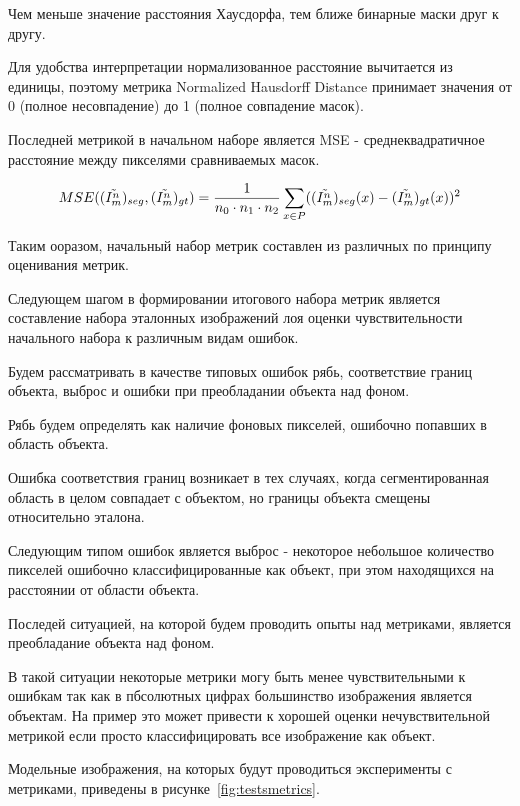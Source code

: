Чем меньше значение расстояния Хаусдорфа, тем ближе бинарные маски друг к другу.

Для удобства интерпретации нормализованное расстояние вычитается из единицы, поэтому метрика Normalized Hausdorff Distance принимает значения от 0 (полное несовпадение) до 1 (полное совпадение масок).

Последней метрикой в начальном наборе является MSE - среднеквадратичное расстояние между пикселями сравниваемых масок.

\begin{equation}\label{eq:MSE}
    MSE((\tilde{I^n_m})_{seg}, (\tilde{I^n_m})_{gt}) = \frac{1}{n_0 \cdot n_1 \cdot n_2} \sum_{x \in P} ((\tilde{I^n_m})_{seg}(x) - (\tilde{I^n_m})_{gt}(x))^2
\end{equation}

Таким ооразом, начальный набор метрик составлен из различных по принципу оценивания метрик.

Следующем шагом в формировании итогового набора метрик является составление набора эталонных изображений лоя оценки чувствительности начального набора к различным видам ошибок.

Будем рассматривать в качестве типовых ошибок рябь, соответствие границ объекта, выброс и ошибки при преобладании объекта над фоном.

Рябь будем определять как наличие фоновых пикселей, ошибочно попавших в область объекта.

Ошибка соответствия границ возникает в тех случаях, когда сегментированная область в целом совпадает с объектом, но границы объекта смещены относительно эталона. 

Следующим типом ошибок является выброс - некоторое небольшое количество пикселей ошибочно классифицированные как объект, при этом находящихся на расстоянии от области объекта.

Последей ситуацией, на которой будем проводить опыты над метриками, является преобладание объекта над фоном. 

В такой ситуации некоторые метрики могу быть менее чувствительными к ошибкам так как в пбсолютных цифрах большинство изображения является объектам. На пример это может привести к хорошей оценки нечувствительной метрикой если просто классифицировать все изображение как объект.

Модельные изображения, на которых будут проводиться эксперименты с метриками, приведены в рисунке~\ref{fig:testsmetrics}.


